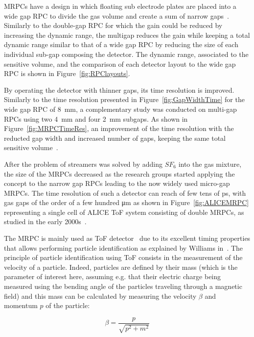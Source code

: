 	MRPCs have a design in which floating sub electrode plates are placed into a wide gap RPC to divide the gas volume and create a sum of narrow gaps~\cite{ZEBALLOS96MRPC,WILLIAMS98}. Similarly to the double-gap RPC for which the gain could be reduced by increasing the dynamic range, the multigap reduces the gain while keeping a total dynamic range similar to that of a wide gap RPC by reducing the size of each individual sub-gap composing the detector. The dynamic range, associated to the sensitive volume, and the comparison of each detector layout to the wide gap RPC is shown in Figure~\ref{fig:RPClayouts}.
	
	By operating the detector with thinner gaps, its time resolution is improved. Similarly to the time resolution presented in Figure~\ref{fig:GapWidthTime} for the wide gap RPC of \SI{8}{mm}, a complementary study was conducted on multi-gap RPCs using two \SI{4}{mm} and four \SI{2}{mm} subgaps. As shown in Figure~\ref{fig:MRPCTimeRes}, an improvement of the time resolution with the reducted gap width and increased number of gaps, keeping the same total sensitive volume~\cite{WILLIAMS98}.
	
	After the problem of streamers was solved by adding $SF_6$ into the gas mixture, the size of the MRPCs decreased as the research groups started applying the concept to the narrow gap RPCs leading to the now widely used micro-gap MRPCs. The time resolution of such a detector can reach of few tens of \si{ps}, with gas gaps of the order of a few hundred \si{\micro m} as shown in Figure~\ref{fig:ALICEMRPC} representing a single cell of ALICE \acf{ToF} system consisting of double MRPCs, as studied in the early 2000s~\cite{ALICE2002}.
	
	The MRPC is mainly used as ToF detector~\cite{ALICE2002,START2002,BESIII2014,CBM2007,MPD2016} due to its excellent timing properties that allows performing particle identification as explained by Williams in~\cite{WILLIAMS2012}. The principle of particle identification using ToF consists in the measurement of the velocity of a particle. Indeed, particles are defined by their mass (which is the parameter of interest here, assuming e.g. that their electric charge being measured using the bending angle of the particles traveling through a magnetic field) and this mass can be calculated by measuring the velocity $\beta$ and momentum $p$ of the particle:
	
	\begin{equation}
		\beta = \frac{p}{\sqrt{p^2 + m^2}}
	\end{equation}
	
